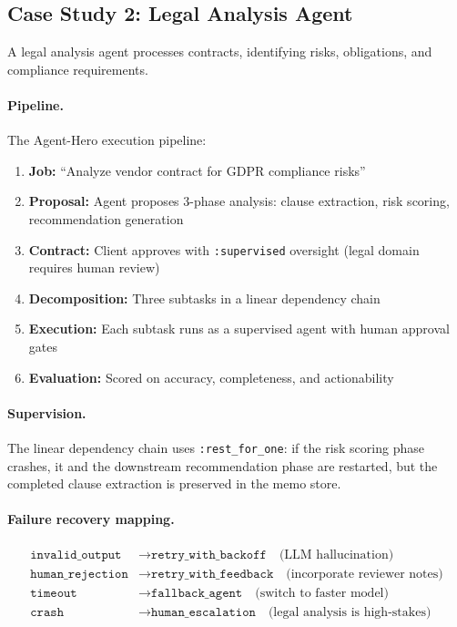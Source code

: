 \documentclass[12pt,a4paper]{article}
\theoremstyle{definition}
\theoremstyle{remark}
\begin{document}
\subsection{Case Study 2: Legal Analysis Agent}

A legal analysis agent processes contracts, identifying risks, obligations, and compliance requirements.

\paragraph{Pipeline.} The Agent-Hero execution pipeline:
\begin{enumerate}[leftmargin=2em]
  \item \textbf{Job:} ``Analyze vendor contract for GDPR compliance risks''
  \item \textbf{Proposal:} Agent proposes 3-phase analysis: clause extraction, risk scoring, recommendation generation
  \item \textbf{Contract:} Client approves with \texttt{:supervised} oversight (legal domain requires human review)
  \item \textbf{Decomposition:} Three subtasks in a linear dependency chain
  \item \textbf{Execution:} Each subtask runs as a supervised agent with human approval gates
  \item \textbf{Evaluation:} Scored on accuracy, completeness, and actionability
\end{enumerate}

\paragraph{Supervision.} The linear dependency chain uses \texttt{:rest\_for\_one}: if the risk scoring phase crashes, it and the downstream recommendation phase are restarted, but the completed clause extraction is preserved in the memo store.

\paragraph{Failure recovery mapping.}
\begin{align*}
  \texttt{invalid\_output} &\to \texttt{retry\_with\_backoff} \quad \text{(LLM hallucination)} \\
  \texttt{human\_rejection} &\to \texttt{retry\_with\_feedback} \quad \text{(incorporate reviewer notes)} \\
  \texttt{timeout} &\to \texttt{fallback\_agent} \quad \text{(switch to faster model)} \\
  \texttt{crash} &\to \texttt{human\_escalation} \quad \text{(legal analysis is high-stakes)}
\end{align*}
\end{document}
